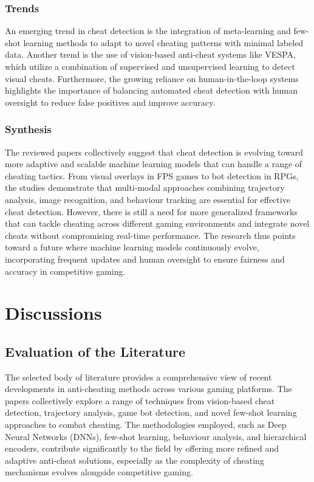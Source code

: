 \documentclass[a4paper, 12pt]{article}
\begin{document}
\subsubsection{Trends}
An emerging trend in cheat detection is the integration of meta-learning and few-shot learning methods to adapt to novel cheating patterns with minimal labeled data. Another trend is the use of vision-based anti-cheat systems like VESPA, which utilize a combination of supervised and unsupervised learning to detect visual cheats. Furthermore, the growing reliance on human-in-the-loop systems highlights the importance of balancing automated cheat detection with human oversight to reduce false positives and improve accuracy.

\subsubsection{Synthesis}
The reviewed papers collectively suggest that cheat detection is evolving toward more adaptive and scalable machine learning models that can handle a range of cheating tactics. From visual overlays in FPS games to bot detection in RPGs, the studies demonstrate that multi-modal approaches combining trajectory analysis, image recognition, and behaviour tracking are essential for effective cheat detection. However, there is still a need for more generalized frameworks that can tackle cheating across different gaming environments and integrate novel cheats without compromising real-time performance. The research thus points toward a future where machine learning models continuously evolve, incorporating frequent updates and human oversight to ensure fairness and accuracy in competitive gaming.

\newpage
\section{Discussions}
\subsection{Evaluation of the Literature}
The selected body of literature provides a comprehensive view of recent developments in anti-cheating methods across various gaming platforms. The papers collectively explore a range of techniques from vision-based cheat detection, trajectory analysis, game bot detection, and novel few-shot learning approaches to combat cheating. The methodologies employed, such as Deep Neural Networks (DNNs), few-shot learning, behaviour analysis, and hierarchical encoders, contribute significantly to the field by offering more refined and adaptive anti-cheat solutions, especially as the complexity of cheating mechanisms evolves alongside competitive gaming.
\end{document}
